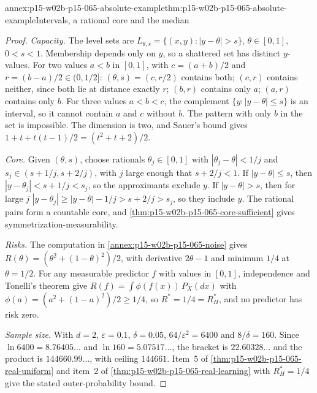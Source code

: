 \begin{annexitem}{annex:p15-w02b-p15-065-absolute-example}{thm:p15-w02b-p15-065-absolute-example}{Intervals, a rational core and the median}
\begin{proof}
\emph{Capacity.} The level sets are
\(L_{\theta,s}=\{(x,y):|y-\theta|>s\}\), \(\theta\in[0,1]\),
\(0<s<1\). Membership depends only on \(y\), so a shattered set has
distinct \(y\)-values. For two values \(a<b\) in \([0,1]\), with
\(c=(a+b)/2\) and \(r=(b-a)/2\in(0,1/2]\): \((\theta,s)=(c,r/2)\) contains
both; \((c,r)\) contains neither, since both lie at distance exactly \(r\);
\((b,r)\) contains only \(a\); \((a,r)\) contains only \(b\). For three
values \(a<b<c\), the complement \(\{y:|y-\theta|\leq s\}\) is an interval,
so it cannot contain \(a\) and \(c\) without \(b\). The pattern with only
\(b\) in the set is impossible. The dimension is two, and Sauer's bound
gives \(1+t+t(t-1)/2=(t^2+t+2)/2\).

\emph{Core.} Given \((\theta,s)\), choose rationals \(\theta_j\in[0,1]\)
with \(|\theta_j-\theta|<1/j\) and \(s_j\in(s+1/j,s+2/j)\), with \(j\) large
enough that \(s+2/j<1\). If \(|y-\theta|\leq s\), then
\(|y-\theta_j|<s+1/j<s_j\), so the approximants exclude \(y\). If
\(|y-\theta|>s\), then for large \(j\)
\(|y-\theta_j|\geq|y-\theta|-1/j>s+2/j>s_j\), so they include \(y\). The
rational pairs form a countable core, and
\cref{thm:p15-w02b-p15-065-core-sufficient} gives
symmetrization-\allowbreak measurability.

\emph{Risks.} The computation in \cref{annex:p15-w02b-p15-065-noise}
gives \(R(\theta)=(\theta^2+(1-\theta)^2)/2\), with derivative
\(2\theta-1\) and minimum \(1/4\) at \(\theta=1/2\). For any measurable
predictor \(f\) with values in \([0,1]\), independence and Tonelli's
theorem give \(R(f)=\int\phi(f(x))\,P_X(dx)\) with
\(\phi(a)=(a^2+(1-a)^2)/2\geq1/4\), so \(R^{*}=1/4=R_H^{*}\), and no
predictor has risk zero.

\emph{Sample size.} With \(d=2\), \(\varepsilon=0.1\), \(\delta=0.05\),
\(64/\varepsilon^2=6400\) and \(8/\delta=160\). Since
\(\ln6400=8.76405\ldots\) and \(\ln160=5.07517\ldots\), the bracket is
\(22.60328\ldots\) and the product is \(144660.99\ldots\), with ceiling
\(144661\). Item~5 of \cref{thm:p15-w02b-p15-065-real-uniform} and item~2
of \cref{thm:p15-w02b-p15-065-real-learning} with \(R_H^{*}=1/4\) give the
stated outer-probability bound.
\end{proof}
\end{annexitem}

